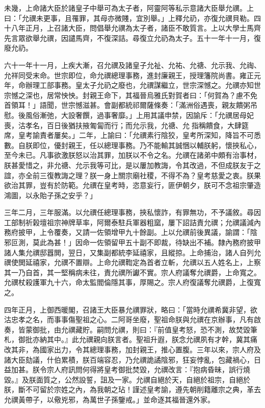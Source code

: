 \begin{pinyinscope}
未幾，上命諸大臣於諸皇子中舉可為太子者，阿靈阿等私示意諸大臣舉允禩。上曰：「允禩未更事，且罹罪，其母亦微賤，宜別舉。」上釋允礽，亦復允禩貝勒。四十八年正月，上召諸大臣，問倡舉允禩為太子者，諸臣不敢質言。上以大學士馬齊先言眾欲舉允禩，因譴馬齊，不復深詰。尋復立允礽為太子。五十一年十一月，復廢允礽。

六十一年十一月，上疾大漸，召允禩及諸皇子允祉、允祐、允禟、允示我、允祹、允祥同受末命。世宗即位，命允禩總理事務，進封廉親王，授理籓院尚書。雍正元年，命辦理工部事務。皇太子允礽之廢也，允禩謀繼立，世宗深憾之。允禩亦知世宗憾之深也，居常怏怏。封親王命下，其福晉烏雅氏對賀者曰：「何賀為？慮不免首領耳！」語聞，世宗憾滋甚。會副都統祁爾薩條奏：「滿洲俗遇喪，親友饋粥吊慰。後風俗漸弛，大設奢饌，過事奢靡。」上用其議申禁，因諭斥：「允禩居母妃喪，沽孝名，百日後猶扶掖匍匐而行；而允示我，允禟、允指稱饋食，大肆筵席，皇考諭責者屢矣。」二年，上諭曰：「允禩素行陰狡，皇考所深知，降旨不可悉數。自朕即位，優封親王，任以總理事務。乃不能輸其誠悃以輔朕躬，懷挾私心，至今未已。凡事欲激朕怒以治其罪，加朕以不令之名。允禩在諸弟中頗有治事材，朕甚愛惜之，非允禟、允示我等可比，是以屢加教誨，令其改過，不但成朕友于之誼，亦全前三復教誨之理？朕一身上關宗廟社稷，不得不為？皇考慈愛之衷。朕果欲治其罪，豈有於防範。允禩在皇考時，恣意妄行，匪伊朝夕，朕可不念祖宗肇造鴻圖，以永貽子孫之安乎？」

三年二月，三年服滿。以允禩任總理事務，挾私懷詐，有罪無功，不予議敘。尋因工部制祈榖壇祖宗神牌草率，阿爾泰駐兵軍器粗窳，屢下詔詰責允禩；允禩議減內務府披甲，上令覆奏，又請一佐領增甲九十餘副。上以允禩前後異議，諭謂：「陰邪叵測，莫此為甚！」因命一佐領留甲五十副不即裁，待缺出不補。隸內務府披甲諸人集允禩邸囂閧，翌日，又集副都統李延禧家，且縱掠。上命捕治，諸人自列允禩使閧延禧家，允禩不置辯。上命允禩鞫定為首者立斬，允禩以五人姓名上，上察其一乃自首，其一堅稱病未往，責允禩所讞不實。宗人府議奪允禩爵，上命寬之。允禩杖殺護軍九十六，命太監閻倫隱其事，厚賜之。宗人府復議奪允禩爵，上復寬之。

四年正月，上御西暖閣，召諸王大臣暴允禩罪狀，略曰：「當時允禩希冀非望，欲沽忠孝之名，而事事傷聖祖之心。二阿哥坐廢，聖祖命朕與允禩在京辦事，凡有啟奏，皆蒙御批，由允禩藏貯。嗣問允禩，則曰：『前值皇考怒，恐不測，故焚毀筆札，御批亦納其中。』此允禩親向朕言者。聖祖升遐，朕念允禩夙有才幹，冀其痛改其非，為國家出力，令其總理事務，加封親王，推心置腹。三年以來，宗人府及諸大臣劾議，什伯累積，朕百端容忍，乃允禩詭譎陰邪，狂妄悖亂，包藏禍心，日益加甚。朕令宗人府訊問何得將皇考御批焚毀，允禩改言：『抱病昏昧，誤行燒毀。』及朕面質之，公然設誓，詛及一家。允禩自絕於天，自絕於祖宗，自絕於朕，斷不可留於宗姓之內，為我朝之玷！謹述皇考諭，遵先朝削籍離宗之典，革去允禩黃帶子，以儆兇邪，為萬世子孫鑒戒。」並命逐其福晉還外家。


\end{pinyinscope}
